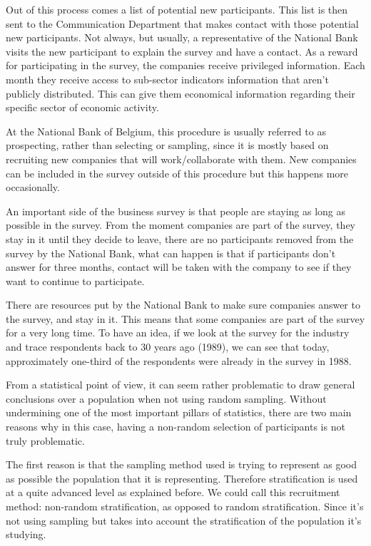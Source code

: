 \documentclass[12pt,a4paper,oneside]{book}
\begin{document}
Out of this process comes a list of potential new participants. This list is then sent to the Communication Department that makes contact with those potential new participants. 
Not always, but usually, a representative of the National Bank visits the new participant to explain the survey and have a contact.
As a reward for participating in the survey, the companies receive privileged information. Each month they receive access to sub-sector indicators information that aren't publicly distributed. This can give them economical information regarding their specific sector of economic activity.

At the National Bank of Belgium, this procedure is usually referred to as prospecting, rather than selecting or sampling, since it is mostly based on recruiting new companies that will work/collaborate with them. New companies can be included in the survey outside of this procedure but this happens more occasionally.


An important side of the business survey is that people are staying as long as possible in the survey.
From the moment companies are part of the survey, they stay in it until they decide to leave, there are no participants removed from the survey by the National Bank, what can happen is that if participants don't answer for three months, contact will be taken with the company to see if they want to continue to participate.

There are resources put by the National Bank to make sure companies answer to the survey, and stay in it.
This means that some companies are part of the survey for a very long time.
To have an idea, if we look at the survey for the industry and trace respondents back to 30 years ago (1989), we can see that today, approximately one-third of the respondents were already in the survey in 1988. 


From a statistical point of view, it can seem rather problematic to draw general conclusions over a population when not using random sampling.
Without undermining one of the most important pillars of statistics, there are two main reasons why in this case, having a non-random selection of participants is not truly problematic.

The first reason is that the sampling method used is trying to represent as good as possible the population that it is representing. Therefore stratification is used at a quite advanced level as explained before. 
We could call this recruitment method: non-random stratification, as opposed to random stratification. Since it's not using sampling but takes into account the stratification of the population it's studying.
\end{document}
